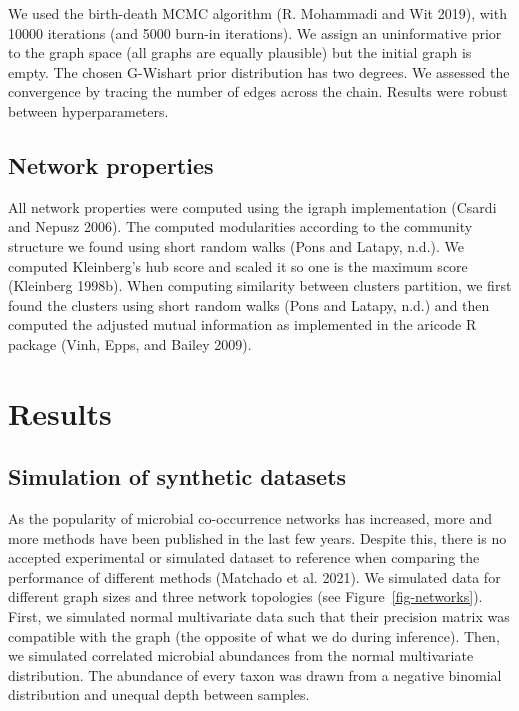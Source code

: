 \documentclass[
  a4paper,
]{article}
\begin{document}
We used the birth-death MCMC algorithm (R. Mohammadi and Wit 2019), with
10000 iterations (and 5000 burn-in iterations). We assign an
uninformative prior to the graph space (all graphs are equally
plausible) but the initial graph is empty. The chosen G-Wishart prior
distribution has two degrees. We assessed the convergence by tracing the
number of edges across the chain. Results were robust between
hyperparameters.

\hypertarget{network-properties}{%
\subsection{Network properties}\label{network-properties}}

All network properties were computed using the igraph implementation
(Csardi and Nepusz 2006). The computed modularities according to the
community structure we found using short random walks (Pons and Latapy,
n.d.). We computed Kleinberg's hub score and scaled it so one is the
maximum score (Kleinberg 1998b). When computing similarity between
clusters partition, we first found the clusters using short random walks
(Pons and Latapy, n.d.) and then computed the adjusted mutual
information as implemented in the aricode R package (Vinh, Epps, and
Bailey 2009).

\hypertarget{results}{%
\section{Results}\label{results}}

\hypertarget{simulation-of-synthetic-datasets-1}{%
\subsection{Simulation of synthetic
datasets}\label{simulation-of-synthetic-datasets-1}}

As the popularity of microbial co-occurrence networks has increased,
more and more methods have been published in the last few years. Despite
this, there is no accepted experimental or simulated dataset to
reference when comparing the performance of different methods (Matchado
et al. 2021). We simulated data for different graph sizes and three
network topologies (see Figure~\ref{fig-networks}). First, we simulated
normal multivariate data such that their precision matrix was compatible
with the graph (the opposite of what we do during inference). Then, we
simulated correlated microbial abundances from the normal multivariate
distribution. The abundance of every taxon was drawn from a negative
binomial distribution and unequal depth between samples.
\end{document}
